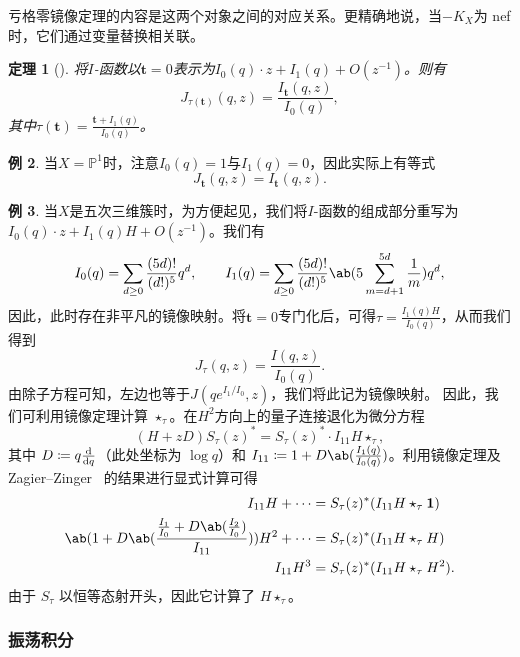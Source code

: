 \documentclass{amsart}
\newtheorem{thm}{定理}[section]
\theoremstyle{definition}
\newtheorem{exm}[thm]{例}
\theoremstyle{remark}
\theoremstyle{plain}
\theoremstyle{definition}
\theoremstyle{remark}
\renewcommand{\P}{\mathbb{P}}
\newcommand{\mbf}[1]{\mathbf{#1}}
\newcommand{\1}{\mathbf{1}}
\newcommand{\2}{\mathbf{2}}
\newcommand{\3}{\mathbf{3}}
\begin{document}
亏格零镜像定理的内容是这两个对象之间的对应关系。更精确地说，当\(-K_X\)为 nef 时，它们通过变量替换相关联。

\begin{thm}[{\cite{Givental1998,LLY1997}}]
将\(I\)-函数以\(\mbf{t} = 0\)表示为\(I_0(q) \cdot z + I_1(q) + O(z^{-1})\)。则有
    \[
        J_{\tau(\mbf{t})}(q,z) = \frac{I_{\mbf{t}}(q,z)}{I_0(q)},
    \]
其中\(\tau(\mbf{t}) = \frac{\mbf{t} + I_1(q)}{I_0(q)}\)。
\end{thm}

\begin{exm}
当\(X = \P^1\)时，注意\(I_0(q) = 1\)与\(I_1(q) = 0\)，因此实际上有等式
    \[ J_{\mbf{t}}(q,z) = I_{\mbf{t}}(q,z). \]
\end{exm}

\begin{exm}
当\(X\)是五次三维簇时，为方便起见，我们将\(I\)-函数的组成部分重写为\(I_0(q) \cdot z + I_1(q)H + O(z^{-1})\)。我们有
    \[ I_0(q) = \sum_{d \geq 0} \frac{(5d)!}{(d!)^5} q^d, \qquad I_1(q) = \sum_{d \geq 0} \frac{(5d)!}{(d!)^5} \ab(5\sum_{m=d+1}^{5d} \frac{1}{m}) q^d, \]
因此，此时存在非平凡的镜像映射。将\(\mbf{t} = 0\)专门化后，可得\(\tau = \frac{I_1(q)H}{I_0(q)}\)，从而我们得到
    \[ J_{\tau}(q,z) = \frac{I(q,z)}{I_0(q)}. \]
由除子方程可知，左边也等于\(J(qe^{I_1/I_0}, z)\)，我们将此记为镜像映射。
因此，我们可利用镜像定理计算 $\star_{\tau}$。在\(H^2\)方向上的量子连接退化为微分方程
    \[ (H+zD) S_{\tau}(z)^* = S_{\tau}(z)^* \cdot I_{11} H \star_{\tau}, \]
其中 $D \coloneqq q \odv{}{q}$（此处坐标为 $\log q$）和 $I_{11} \coloneqq 1 + D \ab(\frac{I_1(q)}{I_0(q)})$。利用镜像定理及 Zagier--Zinger~\cite{ZagierZinger2008} 的结果进行显式计算可得
    \begin{align*}
        I_{11} H + \cdots &= S_{\tau}(z)^* (I_{11} H \star_{\tau} \1) \\
        \ab( 1 + D\ab(\frac{\frac{I_1}{I_0} + D \ab(\frac{I_2}{I_0})}{I_{11}}) ) H^2 + \cdots &= S_{\tau}(z)^* (I_{11} H \star_{\tau} H) \\
        I_{11} H^3 &= S_{\tau}(z)^* (I_{11}H \star_{\tau} H^2).
    \end{align*}
由于 $S_{\tau}$ 以恒等态射开头，因此它计算了 $H \star_{\tau}$。
\end{exm}

\subsubsection{振荡积分}%
\label{ssub:Oscillating integrals}
\end{document}
